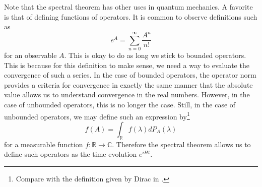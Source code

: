 \documentclass{article}
\begin{document}
Note that the spectral theorem has other uses in quantum mechanics. A favorite is that of defining functions of operators. It is common to observe definitions such as
\begin{equation}
e^A=\sum_{n=0}^\infty\frac{A^n}{n!}
\end{equation}  
for an observable $A$. This is okay to do as long we stick to bounded operators. This is because for this definition to make sense, we need a way to evaluate the convergence of such a series. In the case of bounded operators, the operator norm provides a criteria for convergence in exactly the same manner that the absolute value allows us to understand convergence in the real numbers. However, in the case of unbounded operators, this is no longer the case. Still, in the case of unbounded operators, we may define such an expression by\footnote{Compare with the definition given by Dirac in \cite{Dirac1958}.}
\begin{equation}
f(A)=\int_\mathbb{R}f(\lambda)dP_A(\lambda)
\end{equation}
for a measurable function $f:\mathbb{R}\rightarrow\mathbb{C}$. Therefore the spectral theorem allows us to define such operators as the time evolution $e^{iHt}$.



\end{document}
